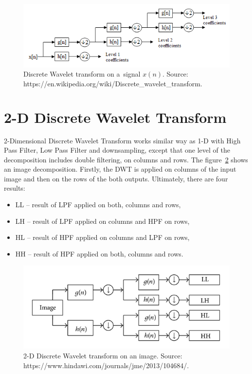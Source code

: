 \begin{figure}[h]
	\centering
	\includegraphics[width=\textwidth]{DWT.png}
	\caption{Discrete Wavelet transform on a~signal $x(n)$. \newline
		Source: https://en.wikipedia.org/wiki/Discrete\_wavelet\_transform.}
	\label{fig:DWT}
\end{figure}


\section{2-D Discrete Wavelet Transform}
\label{sec:2D_DWT}

2-Dimensional Discrete Wavelet Transform works similar way as 1-D with High Pass Filter, Low Pass Filter and downsampling, except that one level of the decomposition includes double filtering, on columns and rows. The figure~\ref{fig:2D_DWT} shows an image decomposition. Firstly, the DWT is applied on columns of the input image and then on the rows of the both outputs. Ultimately, there are four results:

\begin{itemize}
\item LL -- result of LPF applied on both, columns and rows,
\item LH -- result of LPF applied on columns and HPF on rows,
\item HL -- result of HPF applied on columns and LPF on rows,
\item HH -- result of HPF applied on both, columns and rows.
\end{itemize}  

\begin{figure}[h]
	\centering
	\includegraphics[width=\textwidth]{2D_DWT.JPG}
	\caption{2-D Discrete Wavelet transform on an image. \newline
		Source: https://www.hindawi.com/journals/jme/2013/104684/.}
	\label{fig:2D_DWT}
\end{figure}

